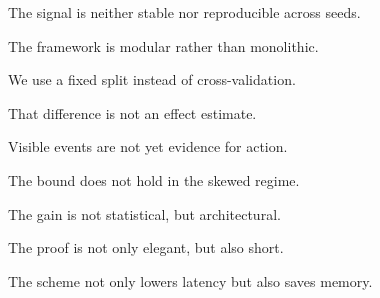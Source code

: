 The signal is neither stable nor reproducible across seeds.

The framework is modular rather than monolithic.

We use a fixed split instead of cross-validation.

That difference is not an effect estimate.

Visible events are not yet evidence for action.

The bound does not hold in the skewed regime.


The gain is not statistical, but architectural.

The proof is not only elegant, but also short.

The scheme not only lowers latency but also saves memory.

